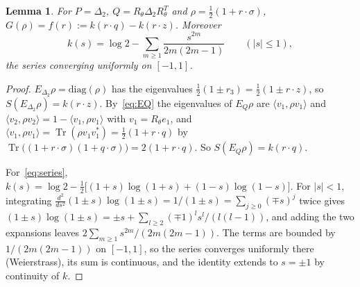\documentclass[11pt]{article}
\DeclareMathOperator{\Tr}{Tr}
\theoremstyle{plain}
\newtheorem{lemma}[theorem]{Lemma}
\theoremstyle{definition}
\theoremstyle{remark}
\begin{document}
\begin{lemma}\label{lem:bloch}
For $P=\Delta_2$, $Q=R_\theta\Delta_2R_\theta^T$ and $\rho=\frac12(1+r\cdot\sigma)$, $G(\rho)=f(r):=k(r\cdot q)-k(r\cdot z)$. Moreover
\begin{equation}\label{eq:series}
  k(s)=\log2-\sum_{m\ge1}\frac{s^{2m}}{2m(2m-1)}\qquad(|s|\le1),
\end{equation}
the series converging uniformly on $[-1,1]$.
\end{lemma}
\begin{proof}
$E_{\Delta_2}\rho=\mathrm{diag}(\rho)$ has the eigenvalues $\frac12(1\pm r_3)=\frac12(1\pm r\cdot z)$, so $S(E_{\Delta_2}\rho)=k(r\cdot z)$. By~\eqref{eq:EQ}
the eigenvalues of $E_Q\rho$ are $\langle v_1,\rho v_1\rangle$ and $\langle v_2,\rho v_2\rangle=1-\langle v_1,\rho v_1\rangle$ with
$v_1=R_\theta e_1$, and $\langle v_1,\rho v_1\rangle=\Tr(\rho v_1v_1^*)=\frac12(1+r\cdot q)$ by $\Tr\bigl((1+r\cdot\sigma)(1+q\cdot\sigma)\bigr)
=2(1+r\cdot q)$. So $S(E_Q\rho)=k(r\cdot q)$.

For~\eqref{eq:series}, $k(s)=\log2-\frac12\bigl[(1+s)\log(1+s)+(1-s)\log(1-s)\bigr]$. For $|s|<1$, integrating
$\frac{d^2}{ds^2}(1\pm s)\log(1\pm s)=1/(1\pm s)=\sum_{j\ge0}(\mp s)^j$ twice gives $(1\pm s)\log(1\pm s)=\pm s+\sum_{l\ge2}(\mp1)^ls^l/(l(l-1))$,
and adding the two expansions leaves $2\sum_{m\ge1}s^{2m}/(2m(2m-1))$. The terms are bounded by $1/(2m(2m-1))$ on $[-1,1]$, so
the series converges uniformly there (Weierstrass), its sum is continuous, and the identity extends to $s=\pm1$ by
continuity of $k$.
\end{proof}
\end{document}
